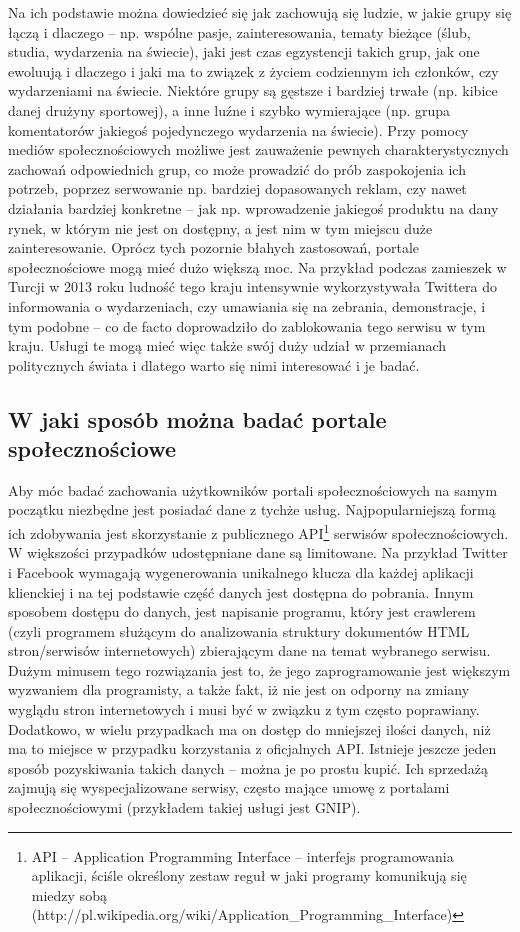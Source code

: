 Na ich podstawie można dowiedzieć się jak zachowują się ludzie, w jakie grupy
się łączą i dlaczego -- np.
wspólne pasje, zainteresowania, tematy bieżące (ślub, studia, wydarzenia na
świecie), jaki jest czas egzystencji takich grup, jak one ewoluują i dlaczego i
jaki ma to związek z życiem codziennym ich członków, czy wydarzeniami na
świecie. Niektóre grupy są gęstsze i bardziej trwałe (np. kibice danej drużyny
sportowej), a inne luźne i szybko wymierające (np. grupa komentatorów jakiegoś
pojedynczego wydarzenia na świecie). Przy pomocy mediów społecznościowych
możliwe jest zauważenie pewnych charakterystycznych zachowań odpowiednich grup,
co może prowadzić do prób zaspokojenia ich potrzeb, poprzez serwowanie np.
bardziej dopasowanych reklam, czy nawet działania bardziej konkretne -- jak np.
wprowadzenie jakiegoś produktu na dany rynek, w którym nie jest on dostępny, a
jest nim w tym miejscu duże zainteresowanie. Oprócz tych pozornie błahych
zastosowań, portale społecznościowe mogą mieć dużo większą moc. Na przykład
podczas zamieszek w Turcji w 2013 roku ludność tego kraju intensywnie
wykorzystywała Twittera do informowania o wydarzeniach, czy umawiania się na
zebrania, demonstracje, i tym podobne -- co de facto doprowadziło do zablokowania
tego serwisu w tym kraju. Usługi te mogą mieć więc także swój duży udział w
przemianach politycznych świata i dlatego warto się nimi interesować i je badać.

\subsection{W jaki sposób można badać portale społecznościowe}
Aby móc badać zachowania użytkowników portali społecznościowych na samym
początku niezbędne jest posiadać dane z tychże usług. Najpopularniejszą formą
ich zdobywania jest skorzystanie z publicznego API\footnote{API -- Application
Programming Interface -- interfejs programowania aplikacji, ściśle określony
zestaw reguł w jaki programy komunikują się miedzy sobą
(http://pl.wikipedia.org/wiki/Application\_Programming\_Interface)} serwisów
społecznościowych. W większości przypadków udostępniane dane są limitowane. Na
przykład Twitter i Facebook wymagają wygenerowania unikalnego klucza dla każdej
aplikacji klienckiej i na tej podstawie część danych jest dostępna do pobrania.
Innym sposobem dostępu do danych, jest napisanie programu, który jest crawlerem
(czyli programem służącym do analizowania struktury dokumentów HTML
stron/serwisów internetowych) zbierającym dane na temat wybranego serwisu. Dużym
minusem tego rozwiązania jest to, że jego zaprogramowanie jest większym
wyzwaniem dla programisty, a także fakt, iż nie jest on odporny na zmiany
wyglądu stron internetowych i musi być w związku z tym często poprawiany.
Dodatkowo, w wielu przypadkach ma on dostęp do mniejszej ilości danych, niż ma
to miejsce w przypadku korzystania z oficjalnych API. Istnieje jeszcze jeden
sposób pozyskiwania takich danych -- można je po prostu kupić. Ich sprzedażą
zajmują się wyspecjalizowane serwisy, często mające umowę z portalami
społecznościowymi (przykładem takiej usługi jest GNIP).

